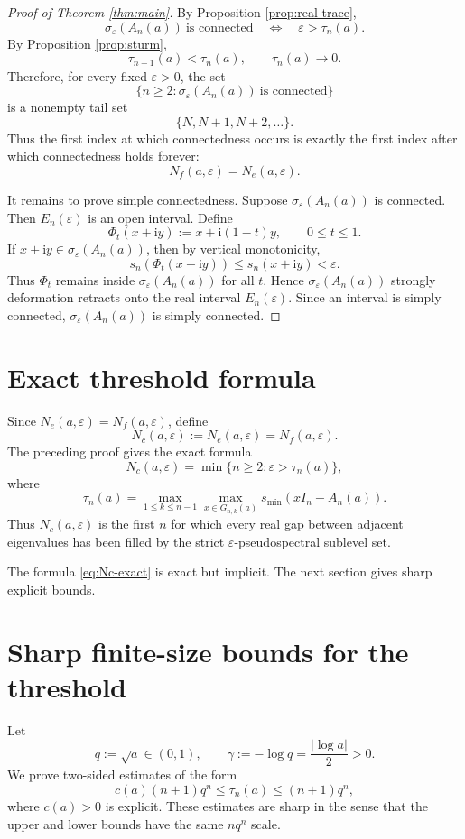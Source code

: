 \documentclass[11pt]{amsart}
\numberwithin{equation}{section}
\newcommand{\eps}{\varepsilon}
\newcommand{\ii}{\mathrm i}
\newcommand{\A}{A}
\begin{document}
\begin{proof}[Proof of Theorem \ref{thm:main}]
By Proposition \ref{prop:real-trace},
\[
\sigma_\eps(\A_n(a))\ \text{is connected}
\quad\Longleftrightarrow\quad
\eps>\tau_n(a).
\]
By Proposition \ref{prop:sturm},
\[
\tau_{n+1}(a)<\tau_n(a),
\qquad
\tau_n(a)\to0.
\]
Therefore, for every fixed \(\eps>0\), the set
\[
\{n\ge2:\sigma_\eps(\A_n(a))\ \text{is connected}\}
\]
is a nonempty tail set
\[
\{N,N+1,N+2,\dots\}.
\]
Thus the first index at which connectedness occurs is exactly the first index after which connectedness holds forever:
\[
N_f(a,\eps)=N_e(a,\eps).
\]

It remains to prove simple connectedness.  Suppose \(\sigma_\eps(\A_n(a))\) is connected.  Then \(E_n(\eps)\) is an open interval.  Define
\[
\Phi_t(x+\ii y):=x+\ii(1-t)y,\qquad 0\le t\le1.
\]
If \(x+\ii y\in\sigma_\eps(\A_n(a))\), then by vertical monotonicity,
\[
s_n(\Phi_t(x+\ii y))\le s_n(x+\ii y)<\eps.
\]
Thus \(\Phi_t\) remains inside \(\sigma_\eps(\A_n(a))\) for all \(t\).  Hence \(\sigma_\eps(\A_n(a))\) strongly deformation retracts onto the real interval \(E_n(\eps)\).  Since an interval is simply connected, \(\sigma_\eps(\A_n(a))\) is simply connected.
\end{proof}

\section{Exact threshold formula}

Since \(N_e(a,\eps)=N_f(a,\eps)\), define
\[
N_c(a,\eps):=N_e(a,\eps)=N_f(a,\eps).
\]
The preceding proof gives the exact formula
\[
N_c(a,\eps)
=
\min\{n\ge2:\eps>\tau_n(a)\},
\tag{5.1}\label{eq:Nc-exact}
\]
where
\[
\tau_n(a)
=
\max_{1\le k\le n-1}
\max_{x\in G_{n,k}(a)}
s_{\min}(xI_n-\A_n(a)).
\tag{5.2}\label{eq:tau-formula}
\]
Thus \(N_c(a,\eps)\) is the first \(n\) for which every real gap between adjacent eigenvalues has been filled by the strict \(\eps\)-pseudospectral sublevel set.

The formula \eqref{eq:Nc-exact} is exact but implicit.  The next section gives sharp explicit bounds.

\section{Sharp finite-size bounds for the threshold}

Let
\[
q:=\sqrt a\in(0,1),
\qquad
\gamma:=-\log q=\frac{|\log a|}{2}>0.
\]
We prove two-sided estimates of the form
\[
c(a)(n+1)q^n\le \tau_n(a)\le (n+1)q^n,
\]
where \(c(a)>0\) is explicit.  These estimates are sharp in the sense that the upper and lower bounds have the same \(nq^n\) scale.
\end{document}
